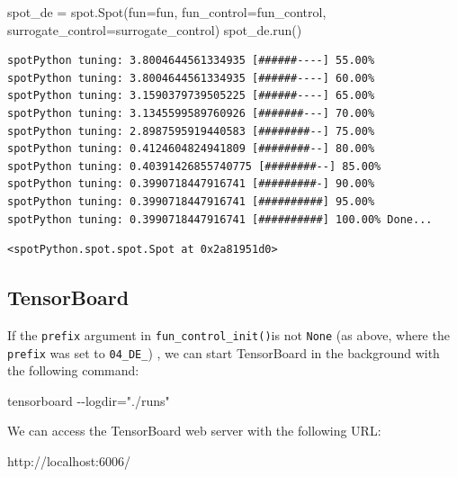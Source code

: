 \documentclass[
  letterpaper,
  DIV=11,
  numbers=noendperiod]{scrreprt}
\newenvironment{Shaded}{\begin{snugshade}}{\end{snugshade}}
\newcommand{\NormalTok}[1]{\textcolor[rgb]{0.00,0.23,0.31}{#1}}
\newcommand{\OperatorTok}[1]{\textcolor[rgb]{0.37,0.37,0.37}{#1}}
\begin{document}
\begin{Shaded}
\begin{Highlighting}[]
\NormalTok{spot\_de }\OperatorTok{=}\NormalTok{ spot.Spot(fun}\OperatorTok{=}\NormalTok{fun,}
\NormalTok{                    fun\_control}\OperatorTok{=}\NormalTok{fun\_control,}
\NormalTok{                    surrogate\_control}\OperatorTok{=}\NormalTok{surrogate\_control)}
\NormalTok{spot\_de.run()}
\end{Highlighting}
\end{Shaded}

\begin{verbatim}
spotPython tuning: 3.8004644561334935 [######----] 55.00% 
spotPython tuning: 3.8004644561334935 [######----] 60.00% 
spotPython tuning: 3.1590379739505225 [######----] 65.00% 
spotPython tuning: 3.1345599589760926 [#######---] 70.00% 
spotPython tuning: 2.8987595919440583 [########--] 75.00% 
spotPython tuning: 0.4124604824941809 [########--] 80.00% 
spotPython tuning: 0.40391426855740775 [########--] 85.00% 
spotPython tuning: 0.3990718447916741 [#########-] 90.00% 
spotPython tuning: 0.3990718447916741 [##########] 95.00% 
spotPython tuning: 0.3990718447916741 [##########] 100.00% Done...
\end{verbatim}

\begin{verbatim}
<spotPython.spot.spot.Spot at 0x2a81951d0>
\end{verbatim}

\subsection{TensorBoard}\label{tensorboard-1}

If the \texttt{prefix} argument in \texttt{fun\_control\_init()}is not
\texttt{None} (as above, where the \texttt{prefix} was set to
\texttt{04\_DE\_}) , we can start TensorBoard in the background with the
following command:

\begin{Shaded}
\begin{Highlighting}[]
\NormalTok{tensorboard {-}{-}logdir="./runs"}
\end{Highlighting}
\end{Shaded}

We can access the TensorBoard web server with the following URL:

\begin{Shaded}
\begin{Highlighting}[]
\NormalTok{http://localhost:6006/}
\end{Highlighting}
\end{Shaded}
\end{document}
